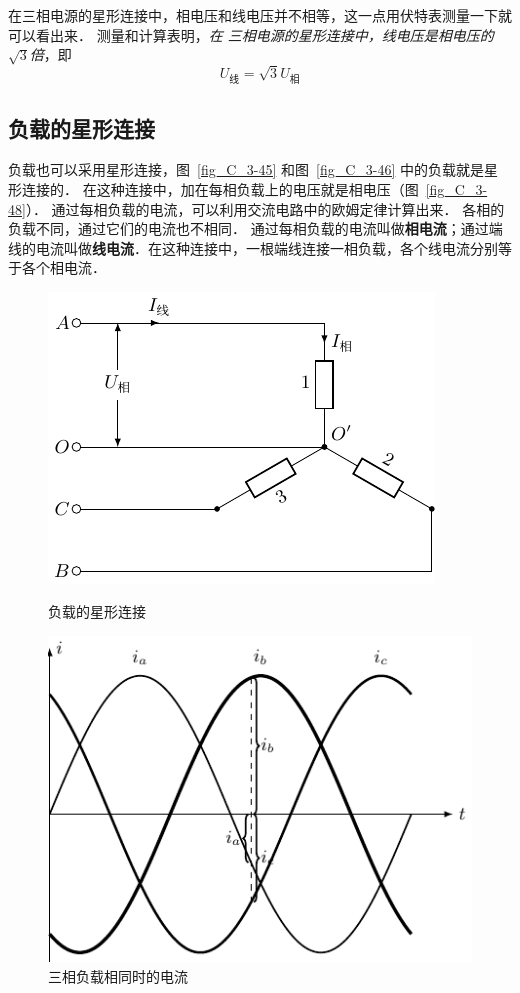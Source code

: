 在三相电源的星形连接中，相电压和线电压并不相等，这一点用伏特表测量一下就可以看出来．
测量和计算表明，\textit{在
三相电源的星形连接中，线电压是相电压的$\sqrt{3}$倍}，即
\[U_{\text{线}}=\sqrt{3}U_{\text{相}}\]

\subsection{负载的星形连接}


负载也可以采用星形连接，图~\ref{fig_C_3-45} 和图~\ref{fig_C_3-46} 中的负载就是星形连接的．
在这种连接中，加在每相负载上的电压就是相电压（图~\ref{fig_C_3-48}）．
通过每相负载的电流，可以利用交流电路中的欧姆定律计算出来．
各相的负载不同，通过它们的电流也不相同．
通过每相负载的电流叫做\textbf{相电流}；通过端线的电流叫做\textbf{线电流}．在这种连接中，一根端线连接一相负载，各个线电流分别等于各个相电流．
\begin{figure}[htbp]
    \centering
    \begin{minipage}[b]{0.47\linewidth}
    	\centering
    	 \includegraphics{fig/C/3-48.pdf}
    	\caption{负载的星形连接}\label{fig_C_3-48}
    \end{minipage}
    \begin{minipage}[b]{0.5\linewidth}
    	\centering
    	\includegraphics{fig/C/3-49.pdf}
    	\caption{三相负载相同时的电流}\label{fig_C_3-49}
    \end{minipage}
\end{figure}

